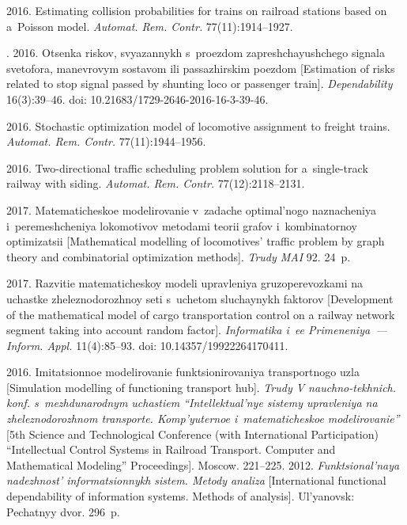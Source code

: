 \begin{multicols}{2}
{{\begin{thebibliography}{99}
 2016. Estimating collision 
probabilities for trains on railroad stations based on a~Poisson model. \textit{Automat.  
Rem. Contr.} 77(11):1914--1927.

. 2016. Otsenka riskov, svyazannykh s~proezdom 
zapreshchayushchego signala svetofora, manevrovym sostavom ili passazhirskim 
poezdom [Estimation of risks related to stop signal passed by shunting loco 
or passenger train]. \textit{Dependability} 16(3):39--46.
doi: 10.21683/1729-2646-2016-16-3-39-46.

 2016. Stochastic optimization 
model of locomotive assignment to freight trains. \textit{Automat. Rem. Contr.} 
77(11):1944--1956.

 2016. Two-directional 
traffic scheduling problem solution for a~single-track railway with siding. \textit{Automat.  
Rem. Contr.} 77(12):2118--2131.

 2017. Ma\-te\-ma\-ti\-che\-skoe 
modelirovanie v~zadache optimal'nogo na\-zna\-che\-niya i~peremeshcheniya lokomotivov 
metodami teorii grafov i~kombinatornoy optimizatsii [Mathematical modelling of 
locomotives' traffic problem by graph theory and combinatorial optimization methods]. 
\textit{Trudy MAI} 92. 24~p.

 2017. 
Razvitie matematicheskoy modeli upravleniya gruzoperevozkami na uchastke 
zheleznodorozhnoy seti s~uchetom sluchaynykh faktorov [Development of the 
mathematical model of cargo transportation control on a railway network segment 
taking into account random factor]. \textit{Informatika i~ee Primeneniya~--- Inform. 
Appl.} 11(4):85--93. doi: 10.14357/19922264170411.

 2016. Imitatsionnoe modelirovanie funktsi\-oni\-ro\-va\-niya 
transportnogo uzla [Simulation modelling of functioning transport hub]. \textit{Trudy 
V nauchno-tekhnich. konf. s~mezhdunarodnym uchastiem ``Intellektual'nye sistemy 
upravleniya na zheleznodorozhnom transporte. Komp'yuternoe i~matematicheskoe 
modelirovanie''} [5th Science and Technological Conference 
(with International Participation) ``Intellectual Control Systems in Railroad Transport. Computer and 
Mathematical Modeling'' Proceedings]. Moscow. 221--225.
 2012. \textit{Funktsional'naya nadezhnost' informatsionnykh sistem. 
Metody analiza} [International functional dependability of information 
systems. Methods of analysis]. Ul'yanovsk: Pechatnyy dvor. 296~p.
\end{thebibliography}

 }
 }

\end{multicols}

